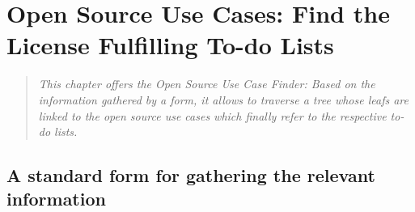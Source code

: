 %
%
%
%
%



\chapter{Open Source Use Cases: Find the License Fulfilling To-do Lists}\label{sec:OSUCfinder}

\footnotesize
\begin{quote}\itshape
This chapter offers the \emph{Open Source Use Case Finder}: Based on the
information gathered by a form, it allows to traverse a tree whose leafs are
linked to the \emph{open source use cases} which finally refer to the respective
to-do lists.
\end{quote}
\normalsize{}

\section{A standard form for gathering the relevant information}
\label{OSLiCStandardFormForGatheringInformation}
 
